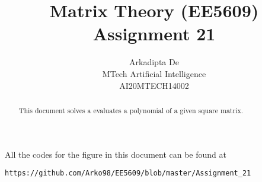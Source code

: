 \documentclass[journal,12pt,twocolumn]{IEEEtran}
\DeclareMathOperator*{\Res}{Res}
\begin{document}
\providecommand{\abs}[1]{\left\vert#1\right\vert}
\providecommand{\res}[1]{\Res\displaylimits_{#1}} 
\providecommand{\norm}[1]{\left\lVert#1\right\rVert}
\providecommand{\mtx}[1]{\mathbf{#1}}
\providecommand{\mean}[1]{E\left[ #1 \right]}
\providecommand{\fourier}{\overset{\mathcal{F}}{ \rightleftharpoons}}
\providecommand{\system}{\overset{\mathcal{H}}{ \longleftrightarrow}}
\newcommand{\solution}{\noindent \textbf{Solution: }}
\newcommand{\cosec}{\,\text{cosec}\,}
\providecommand{\dec}[2]{\ensuremath{\overset{#1}{\underset{#2}{\gtrless}}}}
\newcommand{\myvec}[1]{\ensuremath{\begin{pmatrix}#1\end{pmatrix}}}
\newcommand{\mydet}[1]{\ensuremath{\begin{vmatrix}#1\end{vmatrix}}}
\makeatletter
{}
\makeatother
\let\StandardTheFigure\thefigure
\let\vec\mathbf
\renewcommand{\thefigure}{\theproblem}
\def\putbox#1#2#3{\makebox[0in][l]{\makebox[#1][l]{}\raisebox{\baselineskip}[0in][0in]{\raisebox{#2}[0in][0in]{#3}}}}
     \def\rightbox#1{\makebox[0in][r]{#1}}
     \def\centbox#1{\makebox[0in]{#1}}
     \def\topbox#1{\raisebox{-\baselineskip}[0in][0in]{#1}}
     \def\midbox#1{\raisebox{-0.5\baselineskip}[0in][0in]{#1}}
\vspace{3cm}
\title{Matrix Theory (EE5609) Assignment 21}
\author{Arkadipta De\\MTech Artificial Intelligence\\AI20MTECH14002}

\maketitle
\newpage
\bigskip
\renewcommand{\thefigure}{\theenumi}
\renewcommand{\thetable}{\theenumi}

\begin{abstract}
This document solves a evaluates a polynomial of a given square matrix. 
\end{abstract}
All the codes for the figure in this document can be found at
\begin{lstlisting}
https://github.com/Arko98/EE5609/blob/master/Assignment_21
\end{lstlisting}
\end{document}
